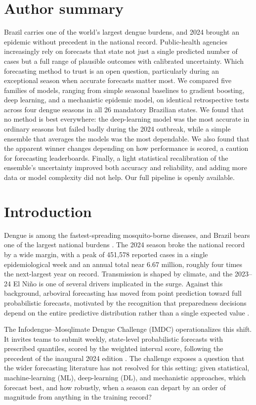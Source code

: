 \documentclass[11pt]{article}
\begin{document}
\section*{Author summary}
\noindent
Brazil carries one of the world's largest dengue burdens, and 2024 brought an epidemic without
precedent in the national record. Public-health agencies increasingly rely on forecasts that state
not just a single predicted number of cases but a full range of plausible outcomes with calibrated
uncertainty. Which forecasting method to trust is an open question, particularly during an
exceptional season when accurate forecasts matter most. We compared five families of models,
ranging from simple seasonal baselines to gradient boosting, deep learning, and a mechanistic
epidemic model, on identical retrospective tests across four dengue seasons in all 26 mandatory
Brazilian states. We found that no method is best everywhere: the deep-learning model was the most
accurate in ordinary seasons but failed badly during the 2024 outbreak, while a simple ensemble
that averages the models was the most dependable. We also found that the apparent winner changes
depending on how performance is scored, a caution for forecasting leaderboards. Finally, a light
statistical recalibration of the ensemble's uncertainty improved both accuracy and reliability, and
adding more data or model complexity did not help. Our full pipeline is openly available.

\section{Introduction}
Dengue is among the fastest-spreading mosquito-borne diseases, and Brazil bears one of the largest
national burdens \citep{lowe2021,colon2021}. The 2024 season broke the national record by a wide
margin, with a peak of 451{,}578 reported cases in a single epidemiological week and an annual total
near 6.67 million, roughly four times the next-largest year on record. Transmission is shaped by
climate, and the 2023--24 El Ni\~no is one of several drivers implicated in the surge. Against this
background, arboviral forecasting has moved from point prediction toward full probabilistic
forecasts, motivated by the recognition that preparedness decisions depend on the entire predictive
distribution rather than a single expected value \citep{johansson2019,cramer2022}.

The Infodengue--Mosqlimate Dengue Challenge (IMDC) operationalizes this shift. It invites teams to
submit weekly, state-level probabilistic forecasts with prescribed quantiles, scored by the weighted
interval score, following the precedent of the inaugural 2024 edition \citep{araujo2026}. The
challenge exposes a question that the wider forecasting literature has not resolved for this
setting: given statistical, machine-learning (ML), deep-learning (DL), and mechanistic approaches,
which forecast best, and how robustly, when a season can depart by an order of magnitude from
anything in the training record?
\end{document}
